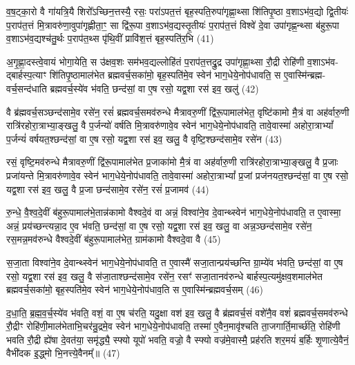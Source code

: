 {\anuvakamend[{अ॒स्मा॒ इन्द्र॑मे॒वैष स॑जा॒ता विश्वा॑ने॒व दे॒वान्थ्स्वेन॑ भाग॒धेये॒नोप॑धावति॒ त ए॒वास्मै᳚ प्राजाप॒त्यो हि त्रीणि॑ च॥ (6)॥}]}

व॒ष॒ट्का॒रो वै गा॑यत्रि॒यै शिरो᳚\-ऽच्छिन॒त्तस्यै॒ रसः॒ परा॑\-ऽपत॒त्तं बृह॒स्पति॒रुपा॑गृह्णा॒थ्सा शि॑तिपृ॒ष्ठा व॒शा\-ऽभ॑व॒द्यो द्वि॒तीयः॑ प॒राप॑त॒त्तं मि॒त्रावरु॑णा॒वुपा॑गृह्णीता॒ꣳ॒ सा द्वि॑रू॒पा व॒शा\-ऽभ॑व॒द्यस्तृ॒तीयः॑ प॒राप॑त॒त्तं विश्वे॑ दे॒वा उपा॑गृह्ण॒न्थ्सा ब॑हुरू॒पा व॒शा\-ऽभ॑व॒द्यश्च॑तु॒र्थः प॒राप॑त॒थ्स पृ॑थि॒वीं प्रावि॑श॒त्तं बृह॒स्पति॑र॒भि (41)

अ॒गृ॒ह्णा॒दस्त्वे॒वायं भोगा॒येति॒ स उ॑क्षव॒शः सम॑भव॒द्यल्लोहि॑तं प॒राप॑त॒त्तद्रु॒द्र उपा॑गृह्णा॒थ्सा रौ॒द्री रोहि॑णी व॒शा\-ऽभ॑व- द्बार्\mbox{}हस्प॒त्याꣳ शि॑तिपृ॒ष्ठामाल॑भेत ब्रह्मवर्च॒सका॑मो॒ बृह॒स्पति॑मे॒व स्वेन॑ भाग॒धेये॒नोप॑धावति॒ स ए॒वास्मि॑न्ब्रह्म- वर्च॒सन्द॑धाति ब्रह्मवर्च॒स्ये॑व भ॑वति॒ छन्द॑सां॒ वा ए॒ष रसो॒ यद्व॒शा रस॑ इव॒ खलु॑ (42)

वै ब्र॑ह्मवर्च॒सञ्छन्द॑सामे॒व रसे॑न॒ रसं॑ ब्रह्मवर्च॒समव॑रुन्धे मैत्रावरु॒णीं द्वि॑रू॒पामाल॑भेत॒ वृष्टि॑कामो मै॒त्रं वा अह॑र्वारु॒णी रात्रि॑रहोरा॒त्राभ्या॒ङ्खलु॒ वै प॒र्जन्यो॑ वर्\mbox{}षति मि॒त्रावरु॑णावे॒व स्वेन॑ भाग॒धेये॒नोप॑धावति॒ तावे॒वास्मा॑ अहोरा॒त्रा\-भ्यां᳚ प॒र्जन्यं॑ वर्\mbox{}षयत॒श्छन्द॑सां॒ वा ए॒ष रसो॒ यद्व॒शा रस॑ इव॒ खलु॒ वै वृष्टि॒श्छन्द॑सामे॒व रसे॑न (43)

रसं॒ वृष्टि॒मव॑रुन्धे मैत्रावरु॒णीं द्वि॑रू॒पामाल॑भेत प्र॒जाका॑मो मै॒त्रं वा अह॑र्वारु॒णी रात्रि॑रहोरा॒त्राभ्या॒ङ्खलु॒ वै प्र॒जाः प्रजा॑यन्ते मि॒त्रावरु॑णावे॒व स्वेन॑ भाग॒धेये॒नोप॑धावति॒ तावे॒वास्मा॑ अहोरा॒त्रा\-भ्यां᳚ प्र॒जां प्रज॑नयत॒श्छन्द॑सां॒ वा ए॒ष रसो॒ यद्व॒शा रस॑ इव॒ खलु॒ वै प्र॒जा छन्द॑सामे॒व रसे॑न॒ रसं॑ प्र॒जामव॑ (44)

रु॒न्धे॒ वै॒श्व॒दे॒वीं ब॑हुरू॒पामाल॑भे॒तान्न॑कामो वैश्वदे॒वं वा अन्नं॒ विश्वा॑ने॒व दे॒वान्थ्स्वेन॑ भाग॒धेये॒नोप॑धावति॒ त ए॒वास्मा॒ अन्नं॒ प्रय॑च्छन्त्यन्ना॒द ए॒व भ॑वति॒ छन्द॑सां॒ वा ए॒ष रसो॒ यद्व॒शा रस॑ इव॒ खलु॒ वा अन्न॒ञ्छन्द॑सामे॒व रसे॑न॒ रस॒मन्न॒मव॑रुन्धे वैश्वदे॒वीं ब॑हुरू॒पामाल॑भेत॒ ग्राम॑कामो वैश्वदे॒वा वै (45)

स॒जा॒ता विश्वा॑ने॒व दे॒वान्थ्स्वेन॑ भाग॒धेये॒नोप॑धावति॒ त ए॒वास्मै॑ सजा॒तान्प्रय॑च्छन्ति ग्रा॒म्ये॑व भ॑वति॒ छन्द॑सां॒ वा ए॒ष रसो॒ यद्व॒शा रस॑ इव॒ खलु॒ वै स॑जा॒ताश्छन्द॑सामे॒व रसे॑न॒ रसꣳ॑ सजा॒तानव॑रुन्धे बार्\mbox{}हस्प॒त्यमु॑क्षव॒शमाल॑भेत ब्रह्मवर्च॒सका॑मो॒ बृह॒स्पति॑मे॒व स्वेन॑ भाग॒धेये॒नोप॑धाव॒ति स ए॒वास्मि॑न्ब्रह्मवर्च॒सम् (46)

द॒धा॒ति॒ ब्र॒ह्म॒व॒र्च॒स्ये॑व भ॑वति॒ वशं॒ वा ए॒ष च॑रति॒ यदु॒क्षा वश॑ इव॒ खलु॒ वै ब्र॑ह्मवर्च॒सं वशे॑नै॒व वशं॑ ब्रह्मवर्च॒समव॑रुन्धे रौ॒द्रीꣳ रोहि॑णी॒माल॑भेताभि॒चर॑न्रु॒द्रमे॒व स्वेन॑ भाग॒धेये॒नोप॑धावति॒ तस्मा॑ ए॒वैन॒मावृ॑श्चति ता॒जगार्ति॒मार्च्छ॑ति॒ रोहि॑णी भवति रौ॒द्री ह्ये॑षा दे॒वत॑या॒ समृ॑द्ध्यै॒ स्फ्यो यूपो॑ भवति॒ वज्रो॒ वै स्फ्यो वज्र॑मे॒वास्मै॒ प्रह॑रति शर॒मयं॑ ब॒र्\mbox{}हिः शृ॒णात्ये॒वैनं॒ वैभी॑दक इ॒द्ध्मो भि॒नत्त्ये॒वैनम्᳚॥ (47)

